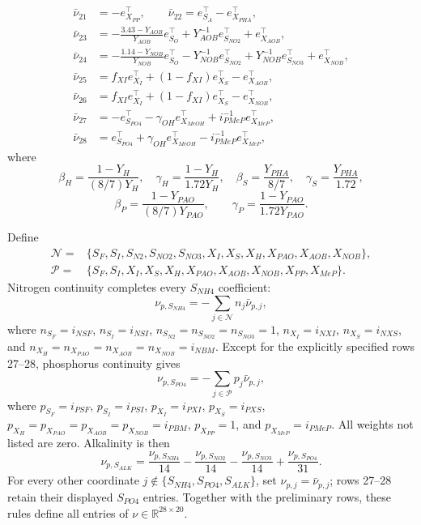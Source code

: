 \documentclass[a4paper,fleqn]{cas-sc}
\newcommand{\R}{\mathbb{R}}
\begin{document}
\begin{align}
\bar\nu_{21}&=-e_{X_{PP}}^\top,\qquad \bar\nu_{22}=e_{S_A}^\top-e_{X_{PHA}}^\top,\\
\bar\nu_{23}&=-\frac{3.43-Y_{AOB}}{Y_{AOB}}e_{S_O}^\top+Y_{AOB}^{-1}e_{S_{NO2}}^\top+e_{X_{AOB}}^\top,\\
\bar\nu_{24}&=-\frac{1.14-Y_{NOB}}{Y_{NOB}}e_{S_O}^\top-Y_{NOB}^{-1}e_{S_{NO2}}^\top+Y_{NOB}^{-1}e_{S_{NO3}}^\top+e_{X_{NOB}}^\top,\\
\bar\nu_{25}&=f_{XI}e_{X_I}^\top+(1-f_{XI})e_{X_S}^\top-e_{X_{AOB}}^\top,\\
\bar\nu_{26}&=f_{XI}e_{X_I}^\top+(1-f_{XI})e_{X_S}^\top-e_{X_{NOB}}^\top,\\
\bar\nu_{27}&=-e_{S_{PO4}}^\top-\gamma_{OH}e_{X_{MeOH}}^\top+i_{PMeP}^{-1}e_{X_{MeP}}^\top,\\
\bar\nu_{28}&=e_{S_{PO4}}^\top+\gamma_{OH}e_{X_{MeOH}}^\top-i_{PMeP}^{-1}e_{X_{MeP}}^\top,
\end{align}
where
\begin{equation}
\beta_H=\frac{1-Y_H}{(8/7)Y_H},\quad \gamma_H=\frac{1-Y_H}{1.72Y_H},\quad
\beta_S=\frac{Y_{PHA}}{8/7},\quad \gamma_S=\frac{Y_{PHA}}{1.72},
\end{equation}
\begin{equation}
\beta_P=\frac{1-Y_{PAO}}{(8/7)Y_{PAO}},\qquad
\gamma_P=\frac{1-Y_{PAO}}{1.72Y_{PAO}}.
\end{equation}

Define
\begin{align}
\mathcal N={}&\{S_F,S_I,S_{N2},S_{NO2},S_{NO3},X_I,X_S,X_H,X_{PAO},X_{AOB},X_{NOB}\},\\
\mathcal P={}&\{S_F,S_I,X_I,X_S,X_H,X_{PAO},X_{AOB},X_{NOB},X_{PP},X_{MeP}\}.
\end{align}
Nitrogen continuity completes every $S_{NH4}$ coefficient:
\begin{equation}
\nu_{p,S_{NH4}}=-\sum_{j\in\mathcal N}n_j\bar\nu_{p,j},
\end{equation}
where $n_{S_F}=i_{NSF}$, $n_{S_I}=i_{NSI}$, $n_{S_{N2}}=n_{S_{NO2}}=n_{S_{NO3}}=1$, $n_{X_I}=i_{NXI}$, $n_{X_S}=i_{NXS}$, and $n_{X_H}=n_{X_{PAO}}=n_{X_{AOB}}=n_{X_{NOB}}=i_{NBM}$. Except for the explicitly specified rows 27--28, phosphorus continuity gives
\begin{equation}
\nu_{p,S_{PO4}}=-\sum_{j\in\mathcal P}p_j\bar\nu_{p,j},
\end{equation}
where $p_{S_F}=i_{PSF}$, $p_{S_I}=i_{PSI}$, $p_{X_I}=i_{PXI}$, $p_{X_S}=i_{PXS}$, $p_{X_H}=p_{X_{PAO}}=p_{X_{AOB}}=p_{X_{NOB}}=i_{PBM}$, $p_{X_{PP}}=1$, and $p_{X_{MeP}}=i_{PMeP}$. All weights not listed are zero. Alkalinity is then
\begin{equation}
\nu_{p,S_{ALK}}=\frac{\nu_{p,S_{NH4}}}{14}-\frac{\nu_{p,S_{NO2}}}{14}-\frac{\nu_{p,S_{NO3}}}{14}+\frac{\nu_{p,S_{PO4}}}{31}.
\end{equation}
For every other coordinate $j\notin\{S_{NH4},S_{PO4},S_{ALK}\}$, set $\nu_{p,j}=\bar\nu_{p,j}$; rows 27--28 retain their displayed $S_{PO4}$ entries. Together with the preliminary rows, these rules define all entries of $\nu\in\R^{28\times20}$.
\end{document}
